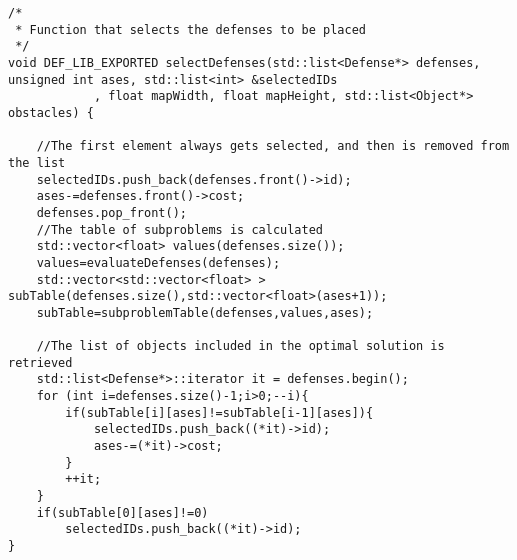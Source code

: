 \begin{lstlisting}
/*
 * Function that selects the defenses to be placed
 */
void DEF_LIB_EXPORTED selectDefenses(std::list<Defense*> defenses, unsigned int ases, std::list<int> &selectedIDs
            , float mapWidth, float mapHeight, std::list<Object*> obstacles) {
    
    //The first element always gets selected, and then is removed from the list
    selectedIDs.push_back(defenses.front()->id);
    ases-=defenses.front()->cost;
    defenses.pop_front();
    //The table of subproblems is calculated
    std::vector<float> values(defenses.size());
    values=evaluateDefenses(defenses);
    std::vector<std::vector<float> > subTable(defenses.size(),std::vector<float>(ases+1));
    subTable=subproblemTable(defenses,values,ases);

    //The list of objects included in the optimal solution is retrieved
    std::list<Defense*>::iterator it = defenses.begin();
    for (int i=defenses.size()-1;i>0;--i){
        if(subTable[i][ases]!=subTable[i-1][ases]){
            selectedIDs.push_back((*it)->id);
            ases-=(*it)->cost;
        }
        ++it; 
    }
    if(subTable[0][ases]!=0)
        selectedIDs.push_back((*it)->id);
}
\end{lstlisting}
